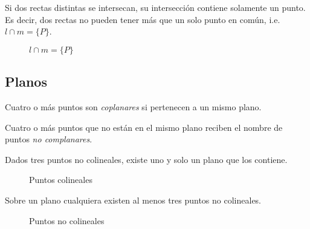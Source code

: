 \clearpage

\begin{theorem}

Si dos rectas distintas se intersecan, su intersección contiene solamente un punto. Es decir, dos rectas no pueden tener más que un solo punto en común, i.e. $l \cap m = \{P\}$.

    \begin{figure}[!h]
        \centering
        
        \caption{$l \cap m = \{P\}$}
        \label{fig:plot19}
    \end{figure}
    
\end{theorem}

\subsection{Planos}

\begin{definition}
Cuatro o más puntos son \textit{coplanares} si pertenecen a un mismo plano.
\end{definition}

\begin{definition}
Cuatro o más puntos que no están en el mismo plano reciben el nombre de puntos \textit{no complanares}.
\end{definition}

\begin{postulate}
    Dados tres puntos no colineales, existe uno y solo un plano que los contiene.
    
    \begin{figure}[!h]
        \centering
        
        \caption{Puntos colineales}
        \label{fig:plot5}
    \end{figure}
\end{postulate}

\begin{postulate}
    Sobre un plano cualquiera existen al menos tres puntos no colineales.
    
    \begin{figure}[!h]
        \centering
        
        \caption{Puntos no colineales}
        \label{fig:plot6}
    \end{figure}
\end{postulate}

\clearpage

